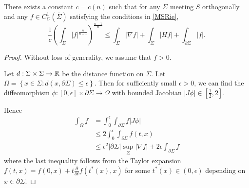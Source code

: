 \begin{theorem} \label{MSwithextra}
    There exists a constant $c=c(n)$ such that for any $\Sigma $ meeting $S$ orthogonally and any $f \in C_{C}^{1}(\bar{\Sigma})$ satisfying the conditions in \autoref{MSRie},
    \[\frac{1}{c}(\int_{\Sigma} \left| f \right| ^{\frac{n}{n-1}})^{\frac{n-1}{n}}\leq \int_{\Sigma} \left| \nabla f \right| +\int_{\Sigma} \left| Hf \right| +\int_{\partial \Sigma} \left| f \right| .\]
\end{theorem}

\begin{proof}
    Without loss of generality, we assume that $f>0$.
    
    Let $d:\Sigma \times \Sigma \to \mathbb{R}$ be the distance function on $\Sigma $. Let $\Omega=\left\{ x \in \Sigma : d(x,\partial \Sigma ) \leq \epsilon \right\}$. Then for sufficiently small $\epsilon >0$, we can find the diffeomorphism $\phi : [0,\epsilon ] \times \partial \Sigma \to \Omega $ with bounded Jacobian $\left| J \phi  \right| \in [\frac{1}{2}, 2] $.
    
    Hence
    \begin{equation} \label{bdyest}
    \begin{split}
        \int_{\Omega }^{}f 
    &= \int_{0}^{\epsilon }\int_{\partial \Sigma} f \left| J \phi  \right|  \\
    & \leq 2 \int_{0}^{\epsilon }\int_{\partial \Sigma} f(t,x)  \\
    & \leq \epsilon ^2 \left| \partial \Sigma  \right| \sup _{\Sigma }\left| \nabla f \right| +2 \epsilon \int_{\partial \Sigma} f
    \end{split}
    \end{equation} 
    where the last inequality follows from the Taylor expansion $f(t,x)=f(0,x)+t \frac{\partial }{\partial t} f (t^*(x),x)$ for some $t^*(x) \in (0,\epsilon )$ depending on $x \in \partial \Sigma .$
    

\end{proof}
